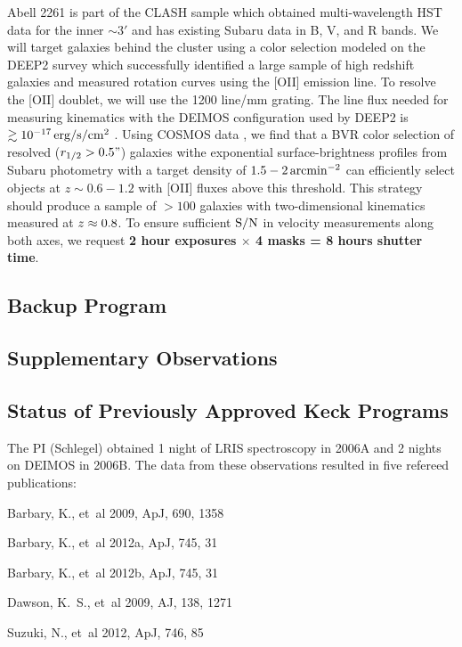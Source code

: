 \documentclass[12pt]{article}
\begin{document}
Abell 2261 is part of the CLASH sample \citep{Postman2012} which obtained multi-wavelength HST data for the inner $\sim3'$ and has existing Subaru data in B, V, and R bands. We will target galaxies behind the cluster using a color selection modeled on the DEEP2 survey \citep{Newman2013} which successfully identified a large sample of high redshift galaxies and measured rotation curves using the [OII] emission line. To resolve the [OII] doublet, we will use the 1200 line/mm grating. The line flux needed for measuring kinematics with the DEIMOS configuration used by DEEP2 is $\gtrsim10^{-17}\,{\rm erg/s/cm^2}$ \citep{Kassin2012}. Using COSMOS data \citep{Jouvel2009}, we find that a BVR color selection of resolved ($r_{1/2}>0.5"$) galaxies withe exponential surface-brightness profiles from Subaru photometry with a target density of $1.5-2\,{\rm arcmin^{-2}}$ can efficiently select objects at $z\sim0.6-1.2$ with [OII] fluxes above this threshold. This strategy should produce a sample of $>100$ galaxies with two-dimensional kinematics measured at $z_{\rm}\approx0.8$. To ensure sufficient ${\rm S/N}$ in velocity measurements along both axes, we request \textbf{2 hour exposures $\times$ 4 masks = 8 hours shutter time}.


\subsection{Backup Program}

\subsection{Supplementary Observations}

\subsection{Status of Previously Approved Keck Programs}
The PI (Schlegel) obtained 1 night of LRIS spectroscopy in 2006A and 2 nights on DEIMOS in 2006B. The data from these observations resulted in five refereed publications:

\begin{description}
  \item {Barbary}, K., {et~al} 2009, ApJ, 690, 1358
  \item {Barbary}, K., {et~al} 2012a, ApJ, 745, 31
  \item {Barbary}, K., {et~al} 2012b, ApJ, 745, 31
  \item {Dawson}, K.~S., {et~al} 2009, AJ,  138, 1271
  \item {Suzuki}, N., {et~al} 2012, ApJ, 746, 85
\end{description}
\end{document}
